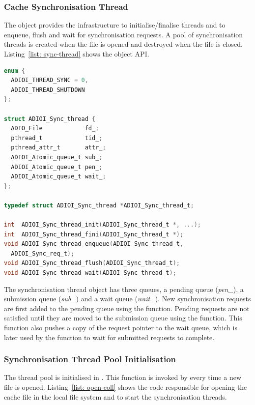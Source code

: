 \subsubsection{Cache Synchronisation Thread}
\label{subsubsec: cache-sync-thread}
The  object provides the infrastructure to initialise/finalise threads and to enqueue, flush and wait for synchronisation requests. A pool of synchronisation threads is created when the file is opened and destroyed 
when the file is closed. Listing~\ref{list: sync-thread} shows the object API.

\begin{lstlisting}[language=C, caption=Synchronisation Thread API, label={list: sync-thread}]
enum {
  ADIOI_THREAD_SYNC = 0,
  ADIOI_THREAD_SHUTDOWN
};

struct ADIOI_Sync_thread {
  ADIO_File            fd_;
  pthread_t            tid_;
  pthread_attr_t       attr_;
  ADIOI_Atomic_queue_t sub_;
  ADIOI_Atomic_queue_t pen_;
  ADIOI_Atomic_queue_t wait_;
};

typedef struct ADIOI_Sync_thread *ADIOI_Sync_thread_t;

int  ADIOI_Sync_thread_init(ADIOI_Sync_thread_t *, ...);
int  ADIOI_Sync_thread_fini(ADIOI_Sync_thread_t *);
void ADIOI_Sync_thread_enqueue(ADIOI_Sync_thread_t, 
  ADIOI_Sync_req_t);
void ADIOI_Sync_thread_flush(ADIOI_Sync_thread_t);
void ADIOI_Sync_thread_wait(ADIOI_Sync_thread_t);
\end{lstlisting}

The synchronisation thread object has three queues, a pending queue (\textit{pen\_}), a submission queue (\textit{sub\_}) and a wait queue (\textit{wait\_}). New synchronisation requests are first added to the pending queue using the 
 function. Pending requests are not satisfied until they are moved to the submission queue using the  function. This function also pushes a copy of the request pointer 
to the wait queue, which is later used by the  function to wait for submitted requests to complete.

\subsubsection{Synchronisation Thread Pool Initialisation}
\label{subsubsec: thread-pool-init}
The thread pool is initialised in . This function is invoked by  every time a new file is opened. Listing~\ref{list: open-coll} shows the code responsible for opening the cache file in the 
local file system and to start the synchronisation threads.

